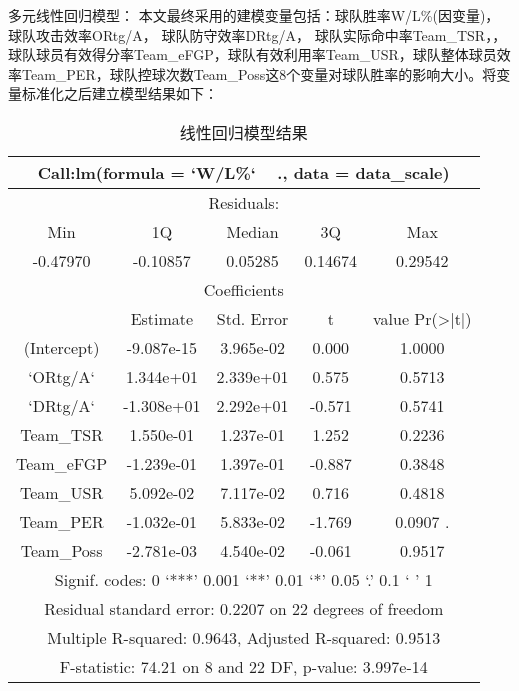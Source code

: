 多元线性回归模型：
本文最终采用的建模变量包括：球队胜率W/L\%(因变量)，球队攻击效率ORtg/A， 球队防守效率DRtg/A， 球队实际命中率Team\_TSR，，球队球员有效得分率Team\_eFGP，球队有效利用率Team\_USR，球队整体球员效率Team\_PER，球队控球次数Team\_Poss这8个变量对球队胜率的影响大小。将变量标准化之后建立模型结果如下：



\begin{table}[h!]
	\begin{tabular}{|c|c|c|c|c|}
		\hline
		\multicolumn{5}{|c|}{Call:lm(formula = `W/L\%` ~ ., data = data\_scale)} \\
		\hline
		\multicolumn{5}{|c|}{ Residuals:} \\
		\hline
		     Min   &    1Q&   Median&       3Q &     Max \\
		-0.47970& -0.10857 & 0.05285 & 0.14674  &0.29542\\
		\hline
		 \multicolumn{5}{|c|}{Coefficients}\\
		 \hline
		            &  Estimate& Std. Error& t &value Pr(>|t|)\\  
		 (Intercept) &-9.087e-15 & 3.965e-02  & 0.000 &  1.0000  \\
		 `ORtg/A`   &  1.344e+01 & 2.339e+01 &  0.575  & 0.5713  \\
		 `DRtg/A` &   -1.308e+01&  2.292e+01  &-0.571  & 0.5741  \\
		 Team\_TSR   &  1.550e-01 & 1.237e-01  & 1.252 &  0.2236 \\
		 Team\_eFGP &  -1.239e-01 & 1.397e-01 & -0.887 &  0.3848  \\
		 Team\_USR &    5.092e-02 & 7.117e-02&   0.716 &  0.4818  \\
		 Team\_PER  &  -1.032e-01 & 5.833e-02&  -1.769  & 0.0907 .\\
		 Team\_Poss  & -2.781e-03 & 4.540e-02&  -0.061 &  0.9517  \\
		 \hline
	\multicolumn{5}{|c|}{Signif. codes:  0 ‘***’ 0.001 ‘**’ 0.01 ‘*’ 0.05 ‘.’ 0.1 ‘ ’ 1}\\
	\hline
	\multicolumn{5}{|c|}{Residual standard error: 0.2207 on 22 degrees of freedom}\\
	\hline 
	\multicolumn{5}{|c|}{Multiple R-squared:  0.9643,	Adjusted R-squared:  0.9513 }\\
	\hline
	\multicolumn{5}{|c|}{F-statistic: 74.21 on 8 and 22 DF,  p-value: 3.997e-14}\\
	\hline
	\end{tabular}
	\centering
	\label{tab:9}
	\caption{线性回归模型结果}
\end{table}

